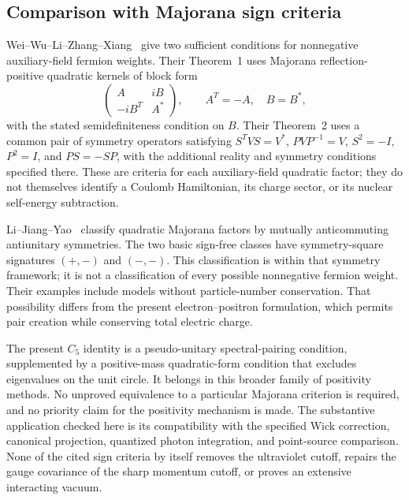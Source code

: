 \subsection{Comparison with Majorana sign criteria}

Wei--Wu--Li--Zhang--Xiang~\cite{Wei} give two sufficient conditions for
nonnegative auxiliary-field fermion weights.  Their Theorem~1 uses
Majorana reflection-positive quadratic kernels of block form
\[
 \begin{pmatrix} A&iB\\-iB^T&A^*\end{pmatrix},
 \qquad A^T=-A,\quad B=B^*,
\]
with the stated semidefiniteness condition on $B$.  Their Theorem~2
uses a common pair of symmetry operators satisfying
$S^TVS=V^*$, $PVP^{-1}=V$, $S^2=-I$, $P^2=I$, and $PS=-SP$,
with the additional reality and symmetry conditions specified there.
These are criteria for each auxiliary-field quadratic factor; they
do not themselves identify a Coulomb Hamiltonian, its charge sector,
or its nuclear self-energy subtraction.

Li--Jiang--Yao~\cite{LiJiangYao} classify quadratic Majorana factors
by mutually anticommuting antiunitary symmetries.  The two basic
sign-free classes have symmetry-square signatures $(+,-)$ and
$(-,-)$.  This classification is within that symmetry framework;
it is not a classification of every possible nonnegative fermion
weight.  Their examples include models without particle-number
conservation.  That possibility differs from the present
electron--positron formulation, which permits pair creation while
conserving total electric charge.

The present $C_5$ identity is a pseudo-unitary spectral-pairing
condition, supplemented by a positive-mass quadratic-form condition
that excludes eigenvalues on the unit circle.  It belongs in this
broader family of positivity methods.  No unproved equivalence to a
particular Majorana criterion is required, and no priority claim for
the positivity mechanism is made.  The substantive application checked
here is its compatibility with the specified Wick correction,
canonical projection, quantized photon integration, and point-source
comparison.  None of the cited sign criteria by itself removes the
ultraviolet cutoff, repairs the gauge covariance of the sharp momentum
cutoff, or proves an extensive interacting vacuum.

